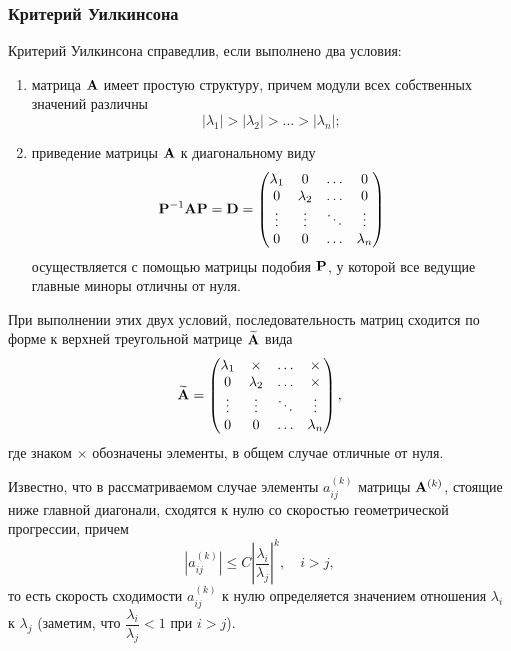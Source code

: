 \documentclass[12pt]{article}
\begin{document}
	\subsubsection*{Критерий Уилкинсона}
	
	Критерий Уилкинсона справедлив, если выполнено два условия:
	\begin{enumerate}
		\item матрица $\bold{A}$ имеет простую структуру, причем модули всех собственных значений различны
		\begin{equation}
			\left|\lambda_1\right|>\left|\lambda_2\right|>\ldots>\left|\lambda_n\right|;
		\end{equation}
		\item приведение матрицы $\bold{A}$ к диагональному виду
		\begin{equation}
			\bold{P}^{-1}\bold{AP}=\bold{D}=
			\begin{pmatrix}
				\lambda_1 & 0 & \ldots & 0 \\
				0         & \lambda_2 & \ldots & 0 \\
				\vdots & \vdots & \ddots & \vdots \\
				0 & 0 & \ldots & \lambda_n
			\end{pmatrix}
		\end{equation}
		осуществляется с помощью матрицы подобия $\bold{P}$, у которой все ведущие главные миноры отличны от нуля.
	\end{enumerate}
	
	При выполнении этих двух условий, последовательность матриц сходится по форме к верхней треугольной матрице $\widetilde{\bold{A}}$ вида
	\begin{equation}
		\widetilde{\bold{A}}=\begin{pmatrix}
			\lambda_1 & \times & \ldots & \times \\
			0         & \lambda_2 & \ldots & \times \\
			\vdots & \vdots & \ddots & \vdots \\
			0 & 0 & \ldots & \lambda_n
		\end{pmatrix},
	\end{equation}
	где знаком $\times$ обозначены элементы, в общем случае отличные от нуля.
	
	Известно, что в рассматриваемом случае элементы $a_{ij}^{\left(k\right)}$ матрицы $\bold{A}^{\left(k\right)}$, стоящие ниже главной диагонали, сходятся к нулю со скоростью геометрической прогрессии, причем
	\begin{equation}
		\left|a_{ij}^{\left(k\right)}\right|\leqslant C\left|\frac{\lambda_i}{\lambda_j}\right|^k,\quad i>j,
	\end{equation}
	то есть скорость сходимости $a_{ij}^{\left(k\right)}$ к нулю определяется значением отношения $\lambda_i$ к $\lambda_j$ (заметим, что $\dfrac{\lambda_i}{\lambda_j}<1$ при $i>j$).
	
\end{document}

